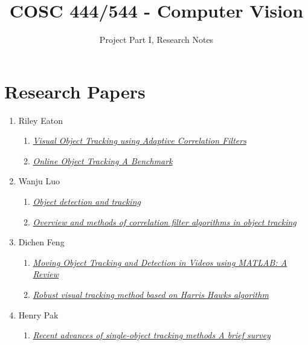 \documentclass{article}
\title{COSC 444/544 - Computer Vision}
\author{Project Part I, Research Notes}
\begin{document}
\maketitle

\section*{Research Papers}

\begin{enumerate}
\item Riley Eaton
  \begin{enumerate}[label*=\arabic*.]
  \item \textit{\href{https://typeset.io/papers/visual-object-tracking-using-adaptive-correlation-filters-1xuhtpe358}{Visual Object Tracking using Adaptive Correlation Filters}}
  \item \textit{\href{https://faculty.ucmerced.edu/mhyang/papers/cvpr13_benchmark.pdf}{Online Object Tracking\: A Benchmark}}
  \end{enumerate}
\item Wanju Luo
  \begin{enumerate}[label*=\arabic*.]
  \item \textit{\href{https://www.sciencedirect.com/science/article/pii/B9780323857871000166?via%3Dihub}{Object detection and tracking}}
  \item \textit{\href{https://link.springer.com/article/10.1007/s40747-020-00161-4}{Overview and methods of correlation filter algorithms in object tracking}}
  \end{enumerate}
\item Dichen Feng
  \begin{enumerate}[label*=\arabic*.]
  \item \textit{\href{https://jst.org.in/index.php/pub/article/view/743/669}{Moving Object Tracking and Detection in Videos using MATLAB: A Review}}
  \item \textit{\href{https://www.semanticscholar.org/paper/Robust-visual-tracking-method-based-on-Harris-Hawks-Charef-Khodja-Abida/e945f79be12f7d64df3d5ef69256e2a0eaec1f03}{Robust visual tracking method based on Harris Hawks algorithm}}
  \end{enumerate}
\item Henry Pak
  \begin{enumerate}[label*=\arabic*.]
  \item \textit{\href{https://www.sciencedirect.com/science/article/pii/S0925231221007220}{Recent advances of single-object tracking methods\: A brief survey}}

\end{enumerate}
\end{enumerate}
\end{document}
